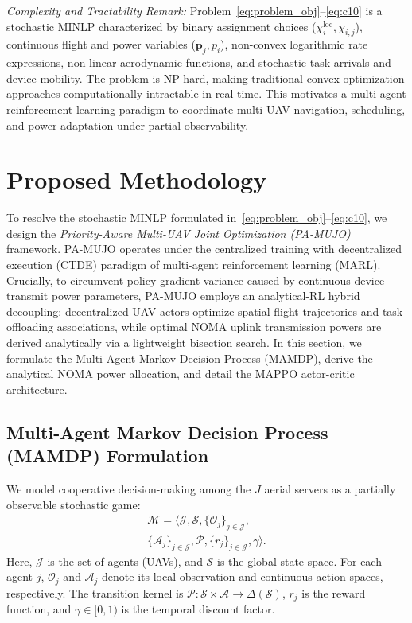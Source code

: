 \documentclass[journal]{IEEEtran}
\begin{document}
\textit{Complexity and Tractability Remark:} Problem~\eqref{eq:problem_obj}--\eqref{eq:c10} is a stochastic MINLP characterized by binary assignment choices ($\chi_i^{\mathrm{loc}}, \chi_{i,j}$), continuous flight and power variables ($\mathbf{p}_j, p_i$), non-convex logarithmic rate expressions, non-linear aerodynamic functions, and stochastic task arrivals and device mobility. The problem is NP-hard, making traditional convex optimization approaches computationally intractable in real time. This motivates a multi-agent reinforcement learning paradigm to coordinate multi-UAV navigation, scheduling, and power adaptation under partial observability.

\section{Proposed Methodology}
\label{section_IV}

To resolve the stochastic MINLP formulated in~\eqref{eq:problem_obj}--\eqref{eq:c10}, we design the \textit{Priority-Aware Multi-UAV Joint Optimization (PA-MUJO)} framework. PA-MUJO operates under the centralized training with decentralized execution (CTDE) paradigm of multi-agent reinforcement learning (MARL). Crucially, to circumvent policy gradient variance caused by continuous device transmit power parameters, PA-MUJO employs an analytical-RL hybrid decoupling: decentralized UAV actors optimize spatial flight trajectories and task offloading associations, while optimal NOMA uplink transmission powers are derived analytically via a lightweight bisection search. In this section, we formulate the Multi-Agent Markov Decision Process (MAMDP), derive the analytical NOMA power allocation, and detail the MAPPO actor-critic architecture.

\subsection{Multi-Agent Markov Decision Process (MAMDP) Formulation}
\label{sec:mamdp}

We model cooperative decision-making among the $J$ aerial servers as a partially observable stochastic game:
\begin{equation}
\begin{aligned}
    \mathcal{M} = \langle \mathcal{J}, \mathcal{S},
    \{\mathcal{O}_j\}_{j \in \mathcal{J}}, \\
    \{\mathcal{A}_j\}_{j \in \mathcal{J}}, \mathcal{P},
    \{r_j\}_{j \in \mathcal{J}}, \gamma \rangle.
\end{aligned}
\end{equation}
Here, $\mathcal{J}$ is the set of agents (UAVs), and $\mathcal{S}$ is the global state space. For each agent $j$, $\mathcal{O}_j$ and $\mathcal{A}_j$ denote its local observation and continuous action spaces, respectively. The transition kernel is $\mathcal{P}: \mathcal{S} \times \mathcal{A} \to \Delta(\mathcal{S})$, $r_j$ is the reward function, and $\gamma \in [0, 1)$ is the temporal discount factor.
\end{document}
